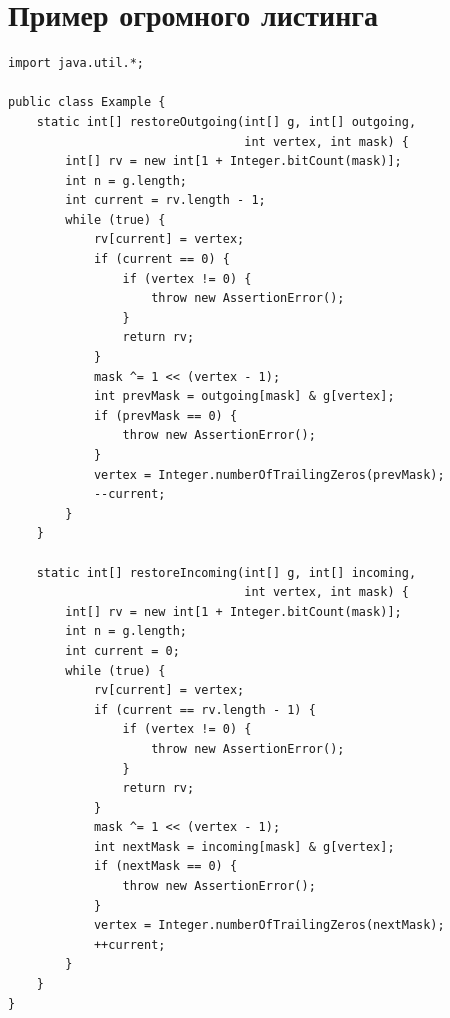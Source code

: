 \documentclass[specification,annotation,times]{itmo-student-thesis}
\begin{document}
\chapter{Пример огромного листинга}

\begin{lstlisting}[caption={Пример большого листинга},label={lstX}]
import java.util.*;

public class Example {
    static int[] restoreOutgoing(int[] g, int[] outgoing,
                                 int vertex, int mask) {
        int[] rv = new int[1 + Integer.bitCount(mask)];
        int n = g.length;
        int current = rv.length - 1;
        while (true) {
            rv[current] = vertex;
            if (current == 0) {
                if (vertex != 0) {
                    throw new AssertionError();
                }
                return rv;
            }
            mask ^= 1 << (vertex - 1);
            int prevMask = outgoing[mask] & g[vertex];
            if (prevMask == 0) {
                throw new AssertionError();
            }
            vertex = Integer.numberOfTrailingZeros(prevMask);
            --current;
        }
    }

    static int[] restoreIncoming(int[] g, int[] incoming,
                                 int vertex, int mask) {
        int[] rv = new int[1 + Integer.bitCount(mask)];
        int n = g.length;
        int current = 0;
        while (true) {
            rv[current] = vertex;
            if (current == rv.length - 1) {
                if (vertex != 0) {
                    throw new AssertionError();
                }
                return rv;
            }
            mask ^= 1 << (vertex - 1);
            int nextMask = incoming[mask] & g[vertex];
            if (nextMask == 0) {
                throw new AssertionError();
            }
            vertex = Integer.numberOfTrailingZeros(nextMask);
            ++current;
        }
    }
}
\end{lstlisting}
                
\end{document}
